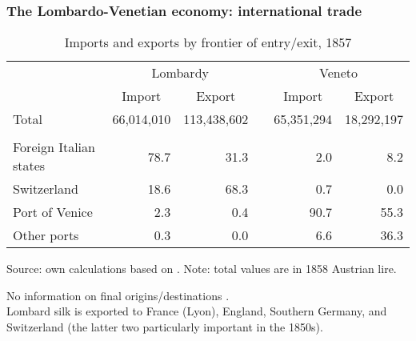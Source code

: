 \documentclass[10pt]{beamer}
\begin{document}
\begin{frame}[label = trade_origins_destinations]
    \frametitle{The Lombardo-Venetian economy: international trade}

\begin{table}[htbp]
  \centering
  \fontsize{8}{8}\selectfont
  \caption{Imports and exports by frontier of entry/exit, 1857}
    \begin{tabular}{lrrrrr}
    \hline
      & \multicolumn{2}{c}{Lombardy} &   & \multicolumn{2}{c}{Veneto} \\
\cline{2-3}\cline{5-6}      & \multicolumn{1}{c}{Import} & \multicolumn{1}{c}{Export} &   & \multicolumn{1}{c}{Import} & \multicolumn{1}{c}{Export} \\
    \hline
    Total &       66,014,010  &    113,438,602  &   &       65,351,294  &       18,292,197  \\
    \\
Foreign Italian states	& 78.7	& 31.3	& & 2.0	& 8.2  \\
Switzerland	& 18.6	& 68.3	& & 0.7	& 0.0 \\
Port of Venice	& 2.3	& 0.4 & & 	90.7	& 55.3 \\
Other ports	& 0.3	& 0.0	& & 6.6	& 36.3 \\
    \hline
    \end{tabular}%
  \label{tab:trade_products}%

    Source: own calculations based on \cite[][Tabb. VII, XIII and XIV]{glazier1966}. Note: total values are in 1858 Austrian lire.


\end{table}%

No information on final origins/destinations \citep[][p. 43]{glazier1966}.  \\
\smallskip
Lombard silk is exported to France (Lyon), England, Southern Germany, and Switzerland (the latter two particularly important in the 1850s). 

\hyperlink{trade_products}{}  \\ 

\end{frame}
\end{document}
